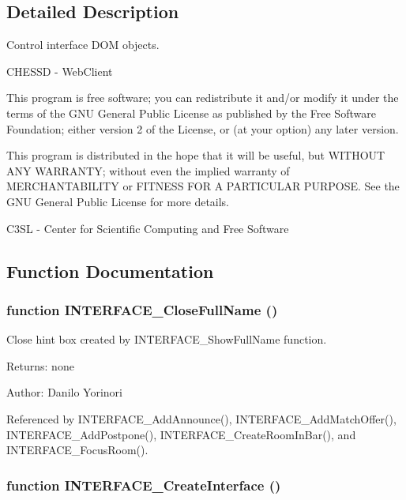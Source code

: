 \subsection{Detailed Description}
Control interface DOM objects. 

CHESSD - WebClient

This program is free software; you can redistribute it and/or modify it under the terms of the GNU General Public License as published by the Free Software Foundation; either version 2 of the License, or (at your option) any later version.

This program is distributed in the hope that it will be useful, but WITHOUT ANY WARRANTY; without even the implied warranty of MERCHANTABILITY or FITNESS FOR A PARTICULAR PURPOSE. See the GNU General Public License for more details.

C3SL - Center for Scientific Computing and Free Software 

\subsection{Function Documentation}
\subsubsection[INTERFACE\_\-CloseFullName]{\setlength{\rightskip}{0pt plus 5cm}function INTERFACE\_\-CloseFullName ()}\label{interface_8js_bfe3ce71dbaf1b9f38e481e35610a5a5}


Close hint box created by INTERFACE\_\-ShowFullName function. 

\begin{Desc}
\item[Returns:]none \end{Desc}
\begin{Desc}
\item[Author:]Danilo Yorinori \end{Desc}


Referenced by INTERFACE\_\-AddAnnounce(), INTERFACE\_\-AddMatchOffer(), INTERFACE\_\-AddPostpone(), INTERFACE\_\-CreateRoomInBar(), and INTERFACE\_\-FocusRoom().
\subsubsection[INTERFACE\_\-CreateInterface]{\setlength{\rightskip}{0pt plus 5cm}function INTERFACE\_\-CreateInterface ()}\label{interface_8js_ecaef5274c46c0a69d1f326629fcd66a}


